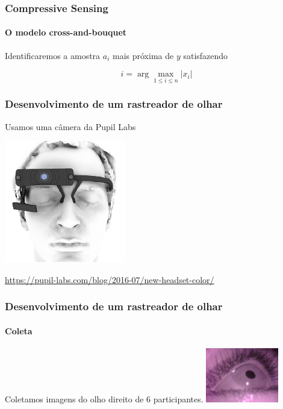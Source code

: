 \documentclass[11pt]{beamer}
\begin{document}
\begin{frame}
\frametitle{Compressive Sensing}
\framesubtitle{O modelo cross-and-bouquet}
\centering
Identificaremos a amostra $a_i$ mais próxima de $y$ satisfazendo

$$i = \arg \max_{1 \leq i \leq n} \vert x_i \vert$$
\end{frame}

\begin{frame}
\frametitle{Desenvolvimento de um rastreador de olhar}

Usamos uma câmera da Pupil Labs

\vspace{1cm}
\centering
\includegraphics[scale=.6]{imagens/pupil.png}

\tiny{\url{https://pupil-labs.com/blog/2016-07/new-headset-color/}}
\end{frame}

\begin{frame}
\frametitle{Desenvolvimento de um rastreador de olhar}
\framesubtitle{Coleta}

Coletamos imagens do olho direito de $6$ participantes.
\centering
\includegraphics[scale=1]{imagens/26.jpg}
\end{frame}
\end{document}
